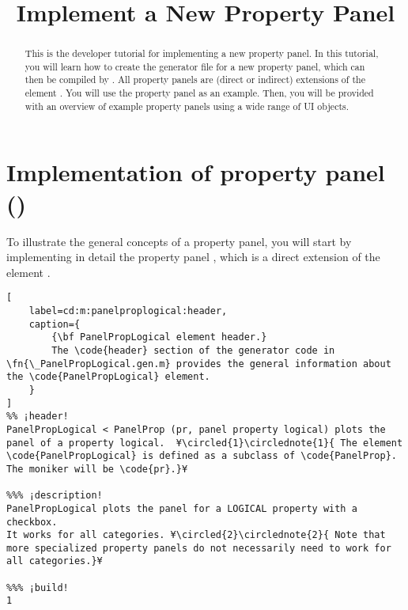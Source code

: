 \documentclass{tufte-handout}
\title{Implement a New Property Panel}
\begin{document}
\maketitle

\begin{abstract}
\noindent
This is the developer tutorial for implementing a new property panel. 
In this tutorial, you will learn how to create the generator file  for a new property panel, which can then be compiled by . 
All property panels are (direct or indirect) extensions of the element .
You will use the property panel  as an example.
Then, you will be provided with an overview of example property panels using a wide range of UI objects.
\end{abstract}

\tableofcontents

\clearpage

\section{Implementation of property panel ()}

To illustrate the general concepts of a property panel, you will start by implementing in detail the property panel , which is a direct extension of the element .

\begin{lstlisting}[
	label=cd:m:panelproplogical:header,
	caption={
		{\bf PanelPropLogical element header.}
		The \code{header} section of the generator code in \fn{\_PanelPropLogical.gen.m} provides the general information about the \code{PanelPropLogical} element.
	}
]
%% ¡header!
PanelPropLogical < PanelProp (pr, panel property logical) plots the panel of a property logical.  ¥\circled{1}\circlednote{1}{ The element \code{PanelPropLogical} is defined as a subclass of \code{PanelProp}. The moniker will be \code{pr}.}¥

%%% ¡description!
PanelPropLogical plots the panel for a LOGICAL property with a checkbox.
It works for all categories. ¥\circled{2}\circlednote{2}{ Note that more specialized property panels do not necessarily need to work for all categories.}¥

%%% ¡build!
1
\end{lstlisting}
\end{document}
